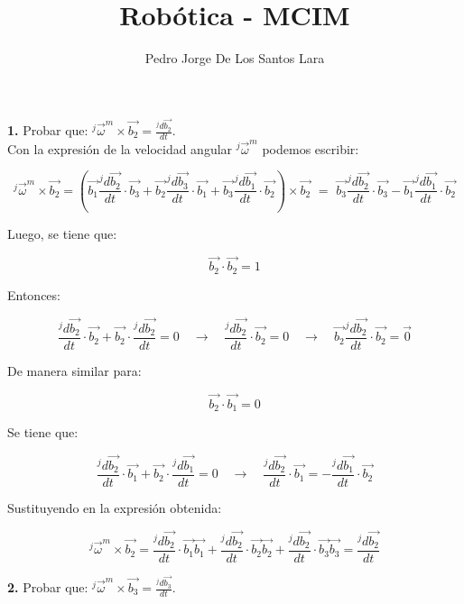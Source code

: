 \documentclass[12pt,letterpaper]{article}
\author{Pedro Jorge De Los Santos Lara}
\title{Robótica - MCIM}
\begin{document}
\maketitle

\textbf{1.} Probar que: $ ^{j}\vec{\omega}^{m} \times \vec{b_{2}} = \frac{^{j} d \vec{b_2} }{dt}  $. \\

Con la expresión de la velocidad angular $^{j}\vec{\omega}^{m}$ podemos escribir:

$$ 
^{j}\vec{\omega}^{m} \times \vec{b_{2}} = 
\left( 
\vec{b_1} \frac{^{j} d \vec{b_2} }{dt} \cdot \vec{b_3} +
\vec{b_2} \frac{^{j} d \vec{b_3} }{dt} \cdot \vec{b_1} +
\vec{b_3} \frac{^{j} d \vec{b_1} }{dt} \cdot \vec{b_2}
\right) \times \vec{b_2}
\,\, = \,\,
\vec{b_3} \frac{^{j} d \vec{b_2} }{dt} \cdot \vec{b_3} - 
\vec{b_1} \frac{^{j} d \vec{b_1} }{dt} \cdot \vec{b_2}
$$

Luego, se tiene que:

$$
\vec{b_2} \cdot \vec{b_2} = 1
$$

Entonces:

$$ 
\frac{^{j} d \vec{b_2} }{dt} \cdot \vec{b_2} + \vec{b_2} \cdot \frac{^{j} d \vec{b_2} }{dt} = 0
 \,\,\,\,\,\, \rightarrow \,\,\,\,\,\,
\frac{^{j} d \vec{b_2} }{dt} \cdot \vec{b_2} = 0  
\,\,\,\,\,\, \rightarrow \,\,\,\,\,\,
\vec{b_2} \frac{^{j} d \vec{b_2} }{dt} \cdot \vec{b_2} = \vec{0}
$$

De manera similar para:

$$
\vec{b_2} \cdot \vec{b_1} = 0
$$

Se tiene que:

$$
\frac{^{j} d \vec{b_2} }{dt} \cdot \vec{b_1} + \vec{b_2} \cdot \frac{^{j} d \vec{b_1} }{dt} = 0
 \,\,\,\,\,\, \rightarrow \,\,\,\,\,\,
\frac{^{j} d \vec{b_2} }{dt} \cdot \vec{b_1} = - \frac{^{j} d \vec{b_1} }{dt} \cdot \vec{b_2}
$$

Sustituyendo en la expresión obtenida:

$$
^{j}\vec{\omega}^{m} \times \vec{b_{2}} = 
\frac{^{j} d \vec{b_2} }{dt} \cdot \vec{b_1}  \vec{b_1} +
\frac{^{j} d \vec{b_2} }{dt} \cdot \vec{b_2}  \vec{b_2} +
\frac{^{j} d \vec{b_2} }{dt} \cdot \vec{b_3}  \vec{b_3} = 
\frac{^{j} d \vec{b_2} }{dt}
$$

\vspace{5mm}
\hline
\vspace{5mm}

\textbf{2.} Probar que: $ ^{j}\vec{\omega}^{m} \times \vec{b_{3}} = \frac{^{j} d \vec{b_3} }{dt}  $. \\
\end{document}
